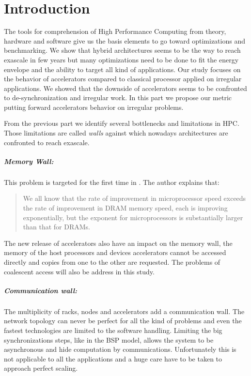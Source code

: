 
\chapter*{Introduction}

The tools for comprehension of High Performance Computing from theory, hardware and software give us the basis elements to go toward optimizations and benchmarking. 
We show that hybrid architectures seems to be the way to reach exascale in few years but many optimizations need to be done to fit the energy envelope and the ability to target all kind of applications. 
Our study focuses on the behavior of accelerators compared to classical processor applied on irregular applications. 
We showed that the downside of accelerators seems to be confronted to de-synchronization and irregular work. 
In this part we propose our metric putting forward accelerators behavior on irregular problems. 

From the previous part we identify several bottlenecks and limitations in HPC. 
Those limitations are called \textit{walls} against which nowadays architectures are confronted to reach exascale. 

\paragraph{Memory Wall: }
This problem is targeted for the first time in \cite{wulf1995hitting}.
The author explains that:
\begin{quotation} We all know that the rate of improvement in microprocessor speed exceeds the rate of improvement in DRAM memory speed, each is improving exponentially, but the exponent for microprocessors is substantially larger than that for DRAMs.
\end{quotation}
The new release of accelerators also have an impact on the memory wall, the memory of the host processors and devices accelerators cannot be accessed directly and copies from one to the other are requested.
The problems of coalescent access will also be address in this study.

\paragraph{Communication wall: } 
The multiplicity of racks, nodes and accelerators add a communication wall. 
The network topology can never be perfect for all the kind of problems and even the fastest technologies are limited to the software handling. 
Limiting the big synchronizations steps, like in the BSP model, allows the system to be asynchronous and hide computation by communications. 
Unfortunately this is not applicable to all the applications and a huge care have to be taken to approach perfect scaling. 

